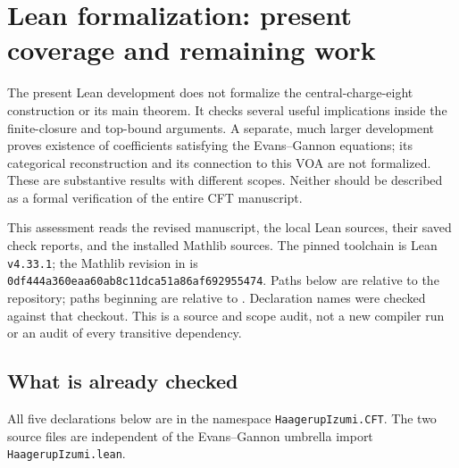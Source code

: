 \providecommand{\leanid}[1]{\nolinkurl{#1}}

\section{Lean formalization: present coverage and remaining work}
\label{sec:review-lean}

The present Lean development does not formalize the central-charge-eight
construction or its main theorem. It checks several useful implications
inside the finite-closure and top-bound arguments. A separate, much larger
development proves existence of coefficients satisfying the Evans--Gannon
equations; its categorical reconstruction and its connection to this VOA
are not formalized. These are substantive results with different scopes.
Neither should be described as a formal verification of the entire CFT
manuscript.

This assessment reads the revised manuscript, the local Lean sources,
their saved check reports, and the installed Mathlib sources. The pinned
toolchain is Lean \leanid{v4.33.1}; the Mathlib revision in
 is
\leanid{0df444a360eaa60ab8c11dca51a86af692955474}.
Paths below are relative to the repository; paths beginning
 are relative to
. Declaration names were checked
against that checkout. This is a source and scope audit, not a new
compiler run or an audit of every transitive dependency.

\subsection{What is already checked}

All five declarations below are in the namespace
\leanid{HaagerupIzumi.CFT}. The two source files are independent of
the Evans--Gannon umbrella import \leanid{HaagerupIzumi.lean}.

